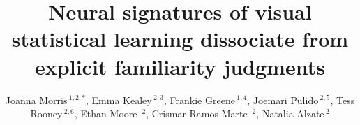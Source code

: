 \documentclass[utf8]{FrontiersinHarvard} %
\def\firstAuthorLast{Morris {et~al.}} %
\def\Authors{Joanna Morris\,$^{1,2,*}$, Emma Kealey\,$^{2,3}$, Frankie Greene\,$^{1,4}$, Joemari Pulido\,$^{2,5}$, Tess Rooney\,$^{2,6}$, Ethan Moore\, $^{2}$, Crismar Ramos-Marte\, $^{2}$, Natalia Alzate\,$^{2}$}
\begin{document}
	\onecolumn
	
	\title[Running Title]{Neural signatures of visual statistical learning dissociate from explicit familiarity judgments} 
	
	\author[\firstAuthorLast ]{\Authors} %
	\address{} %
	\correspondance{} %
	
	\extraAuth{}%
	
	
	\maketitle
	
\end{document}
